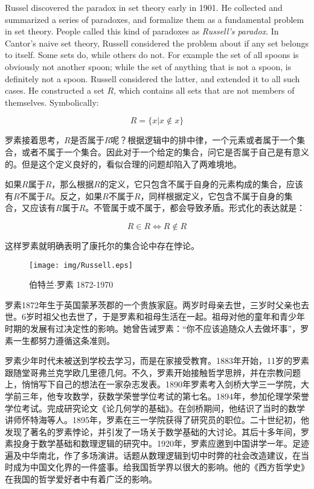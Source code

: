 \documentclass{article}
\begin{document}
Russel discovered the paradox in set theory early in 1901. He collected and summarized a series of paradoxes, and formalize them as a fundamental problem in set theory. People called this kind of paradoxes as {\em Russell's paradox}. In Cantor's naive set theory, Russell considered the problem about if any set belongs to itself. Some sets do, while others do not. For example the set of all spoons is obviously not another spoon; while the set of anything that is not a spoon, is definitely not a spoon. Russell considered the latter, and extended it to all such cases. He constructed a set $R$, which contains all sets that are not members of themselves. Symbolically:

\[
R = \{ x | x \notin x \}
\]

罗素接着思考，$R$是否属于$R$呢？根据逻辑中的排中律，一个元素或者属于一个集合，或者不属于一个集合。因此对于一个给定的集合，问它是否属于自己是有意义的。但是这个定义良好的，看似合理的问题却陷入了两难境地。

如果$R$属于$R$，那么根据$R$的定义，它只包含不属于自身的元素构成的集合，应该有$R$不属于$R$。反之，如果$R$不属于$R$，同样根据定义，它包含不属于自身的集合，又应该有$R$属于$R$。不管属于或不属于，都会导致矛盾。形式化的表达就是：

\[
R \in R \iff R \notin R
\]

这样罗素就明确表明了康托尔的集合论中存在悖论。

\begin{wrapfigure}{R}{0.3\textwidth}
 \centering
 \texttt{[image: img/Russell.eps]}
 \captionsetup{labelformat=empty}
 \caption{伯特兰$\cdot$罗素 1872-1970}
 \label{fig:Russell}
\end{wrapfigure}

罗素1872年生于英国蒙茅茨郡的一个贵族家庭。两岁时母亲去世，三岁时父亲也去世。6岁时祖父也去世了，于是罗素和祖母生活在一起。祖母对他的童年和青少年时期的发展有过决定性的影响。她曾告诫罗素：“你不应该追随众人去做坏事”，罗素一生都努力遵循这条准则。

罗素少年时代未被送到学校去学习，而是在家接受教育。1883年开始，11岁的罗素跟随堂哥弗兰克学欧几里德几何。不久，罗素开始接触哲学思辨，并在宗教问题上，悄悄写下自己的想法在一家杂志发表。1890年罗素考入剑桥大学三一学院，大学前三年，他专攻数学，获数学荣誉学位考试的第七名。1894年，参加伦理学荣誉学位考试。完成研究论文《论几何学的基础》。在剑桥期间，他结识了当时的数学讲师怀特海等人。1895年，罗素在三一学院获得了研究员的职位。二十世纪初，他发现了著名的罗素悖论，并引发了一场关于数学基础的大讨论。其后十多年间，罗素投身于数学基础和数理逻辑的研究中。1920年，罗素应邀到中国讲学一年。足迹遍及中华南北，作了多场演讲。话题从数理逻辑到切中时弊的社会改造建议，在当时成为中国文化界的一件盛事。给我国哲学界以很大的影响。他的《西方哲学史》在我国的哲学爱好者中有着广泛的影响。
\end{document}
